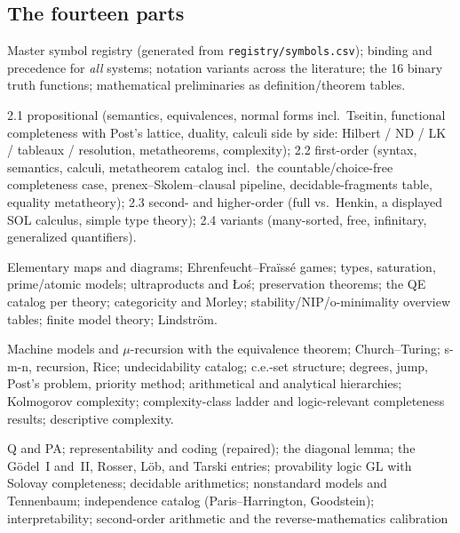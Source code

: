 \documentclass[11pt,letterpaper]{article}
\begin{document}
\subsection{The fourteen parts}
\begin{description}[style=nextline]
  \item[Part 1 --- Notation, Symbols, and Conventions.]
    Master symbol registry (generated from
    \texttt{registry/symbols.csv}); binding and precedence for
    \emph{all} systems; notation variants across the literature; the
    16 binary truth functions; mathematical preliminaries as
    definition/theorem tables.
  \item[Part 2 --- Classical Logic.]
    2.1 propositional (semantics, equivalences, normal forms incl.\
    Tseitin, functional completeness with Post's lattice, duality,
    calculi side by side: Hilbert / ND / LK / tableaux / resolution,
    metatheorems, complexity); 2.2 first-order (syntax, semantics,
    calculi, metatheorem catalog incl.\ the countable/choice-free
    completeness case, prenex--Skolem--clausal pipeline,
    decidable-fragments table, equality metatheory); 2.3 second- and
    higher-order (full vs.\ Henkin, a displayed SOL calculus, simple
    type theory); 2.4 variants (many-sorted, free, infinitary,
    generalized quantifiers).
  \item[Part 3 --- Model Theory.]
    Elementary maps and diagrams; Ehrenfeucht--Fra\"iss\'e games;
    types, saturation, prime/atomic models; ultraproducts and
    \L o\'s; preservation theorems; the QE catalog per theory;
    categoricity and Morley; stability/NIP/o-minimality overview
    tables; finite model theory; Lindstr\"om.
  \item[Part 4 --- Computability and Complexity.]
    Machine models and $\mu$-recursion with the equivalence theorem;
    Church--Turing; s-m-n, recursion, Rice; undecidability catalog;
    c.e.-set structure; degrees, jump, Post's problem, priority
    method; arithmetical and analytical hierarchies; Kolmogorov
    complexity; complexity-class ladder and logic-relevant
    completeness results; descriptive complexity.
  \item[Part 5 --- Arithmetic and Incompleteness.]
    Q and PA; representability and coding (repaired); the diagonal
    lemma; the G\"odel~I and~II, Rosser, L\"ob, and Tarski entries;
    provability logic GL with Solovay completeness; decidable
    arithmetics; nonstandard models and Tennenbaum; independence
    catalog (Paris--Harrington, Goodstein); interpretability;
    second-order arithmetic and the reverse-mathematics calibration

\end{description}
\end{document}
